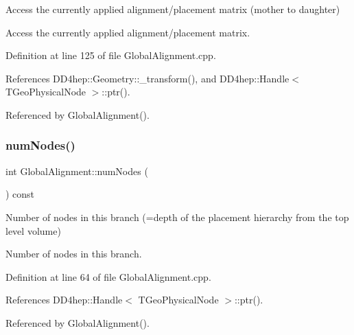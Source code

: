 Access the currently applied alignment/placement matrix (mother to daughter) 

Access the currently applied alignment/placement matrix. 

Definition at line 125 of file Global\+Alignment.\+cpp.



References D\+D4hep\+::\+Geometry\+::\+\_\+transform(), and D\+D4hep\+::\+Handle$<$ T\+Geo\+Physical\+Node $>$\+::ptr().



Referenced by Global\+Alignment().

\hypertarget{class_d_d4hep_1_1_alignments_1_1_global_alignment_af98ddcc7a707a635f9e7545faadf4fb5}{}\label{class_d_d4hep_1_1_alignments_1_1_global_alignment_af98ddcc7a707a635f9e7545faadf4fb5} 
\subsubsection{\texorpdfstring{num\+Nodes()}{numNodes()}}
{\footnotesize\ttfamily int Global\+Alignment\+::num\+Nodes (\begin{DoxyParamCaption}{ }\end{DoxyParamCaption}) const}



Number of nodes in this branch (=depth of the placement hierarchy from the top level volume) 

Number of nodes in this branch. 

Definition at line 64 of file Global\+Alignment.\+cpp.



References D\+D4hep\+::\+Handle$<$ T\+Geo\+Physical\+Node $>$\+::ptr().



Referenced by Global\+Alignment().

\hypertarget{class_d_d4hep_1_1_alignments_1_1_global_alignment_a723fc5d2669d586790c48ff820880171}{}\label{class_d_d4hep_1_1_alignments_1_1_global_alignment_a723fc5d2669d586790c48ff820880171} 
